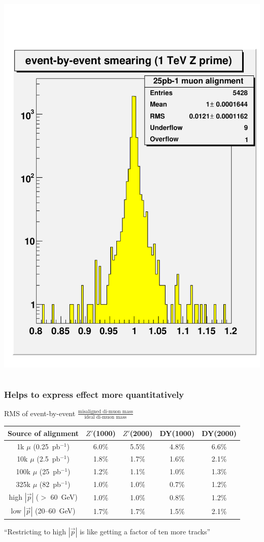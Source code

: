 \documentclass[compress]{beamer}
\begin{document}
\begin{frame}
\begin{columns}
\includegraphics[width=\linewidth]{smearing_events100k.pdf}
\end{columns}
\end{frame}

\begin{frame}
\frametitle{Helps to express effect more quantitatively}

RMS of event-by-event $\displaystyle \frac{\mbox{misaligned di-muon mass}}{\mbox{ideal di-muon mass}}$

\vspace{0.75 cm}
\renewcommand{\arraystretch}{1.2}
\begin{tabular}{c c c c c}
Source of alignment & $Z'$(1000) & $Z'$(2000) & DY(1000) & DY(2000) \\\hline
1k $\mu$ (0.25~pb$^{-1}$) & 6.0\% & 5.5\% & 4.8\% & 6.6\% \\
10k $\mu$ (2.5~pb$^{-1}$) & 1.8\% & 1.7\% & 1.6\% & 2.1\% \\
100k $\mu$ (25~pb$^{-1}$) & 1.2\% & 1.1\% & 1.0\% & 1.3\% \\
325k $\mu$ (82~pb$^{-1}$) & 1.0\% & 1.0\% & 0.7\% & 1.2\% \\\hline
high $|\vec{p}|$ ($>$ 60~GeV) & 1.0\% & 1.0\% & 0.8\% & 1.2\% \\
low $|\vec{p}|$ (20--60~GeV) & 1.7\% & 1.7\% & 1.5\% & 2.1\%
\end{tabular}

\vspace{0.5 cm}
``Restricting to high $|\vec{p}|$ is like getting a factor of ten more tracks''
\end{frame}
\end{document}
